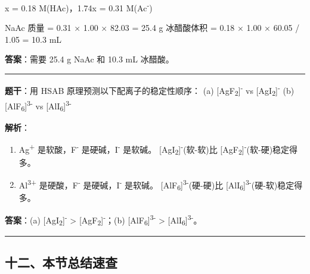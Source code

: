 x = 0.18 M(HAc)，1.74x = 0.31 M(Ac\textsuperscript{-})

NaAc 质量 = 0.31 × 1.00 × 82.03 = 25.4 g
冰醋酸体积 = 0.18 × 1.00 × 60.05 / 1.05 = 10.3 mL

\textbf{答案}：需要 25.4 g NaAc 和 10.3 mL 冰醋酸。

\begin{center}\rule{0.5\linewidth}{0.5pt}\end{center}

\textbf{题干}：用 HSAB 原理预测以下配离子的稳定性顺序：
(a) {[}AgF\textsubscript{2}{]}\textsuperscript{-} vs {[}AgI\textsubscript{2}{]}\textsuperscript{-}
(b) {[}AlF\textsubscript{6}{]}\textsuperscript{3-} vs {[}AlI\textsubscript{6}{]}\textsuperscript{3-}

\textbf{解析}：

\begin{enumerate}
\def\labelenumi{(\alph{enumi})}
\item
  Ag\textsuperscript{+} 是软酸，F\textsuperscript{-} 是硬碱，I\textsuperscript{-} 是软碱。
  {[}AgI\textsubscript{2}{]}\textsuperscript{-}(软-软)比 {[}AgF\textsubscript{2}{]}\textsuperscript{-}(软-硬)稳定得多。
\item
  Al\textsuperscript{3+} 是硬酸，F\textsuperscript{-} 是硬碱，I\textsuperscript{-} 是软碱。
  {[}AlF\textsubscript{6}{]}\textsuperscript{3-}(硬-硬)比 {[}AlI\textsubscript{6}{]}\textsuperscript{3-}(硬-软)稳定得多。
\end{enumerate}

\textbf{答案}：(a) {[}AgI\textsubscript{2}{]}\textsuperscript{-} \textgreater{} {[}AgF\textsubscript{2}{]}\textsuperscript{-}；(b) {[}AlF\textsubscript{6}{]}\textsuperscript{3-} \textgreater{} {[}AlI\textsubscript{6}{]}\textsuperscript{3-}。

\begin{center}\rule{0.5\linewidth}{0.5pt}\end{center}

\subsection{十二、本节总结速查}\label{ux5341ux4e8cux672cux8282ux603bux7ed3ux901fux67e5}

